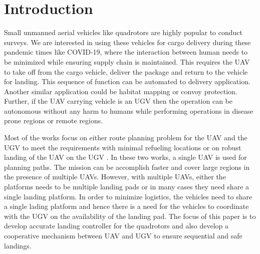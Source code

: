 \documentclass[conf]{new-aiaa}
\begin{document}
\section{Introduction}

Small unmanned aerial vehicles like quadrotors are highly popular to conduct surveys. We are interested in using these vehicles for cargo delivery during these pandemic times like COVID-19, where the interaction between human needs to be minimized while ensuring  supply chain is maintained. This requires the UAV to take off from the cargo vehicle, deliver the package and return to the vehicle for landing. This sequence of function can be automated to delivery application. Another similar application could be habitat mapping or convoy protection. Further, if the UAV carrying vehicle is an UGV then the operation can be autonomous without any harm to humans while performing operations in disease prone regions or remote regions. 




Most of the works focus on either route planning problem for the UAV and the UGV to meet the requirements with minimal refueling locations \cite{maini2019cooperative,mathew2015planning,manyam2016path} or on robust  landing of the UAV on the UGV \cite{gautam2017autonomous,serra2016landing,ghommam2017autonomous}. In these two works, a single UAV is used for planning paths. The mission can be accomplish faster and cover large regions in the presence of multiple UAVs. However, with multiple UAVs, either the platforms needs to be multiple landing pads or in many cases they need share a single landing platform. In order to minimize logistics, the vehicles need to share a single lading platform and hence there is a need for the vehicles to coordinate with the UGV on the availability of the landing pad. The focus of this paper is to develop accurate landing controller for the quadrotors and also develop a cooperative mechanism between UAV and UGV to ensure sequential and safe landings.


\cite{herisse2012landing
saripalli2006landing
serra2016landing
ghommam2017autonomous
falanga2017vision
vlantis2015quadrotor
li2019fast
jfr2
Araar2017
campoy2
campoy1
7139490
drones2040034}


\cite{}


\end{document}
